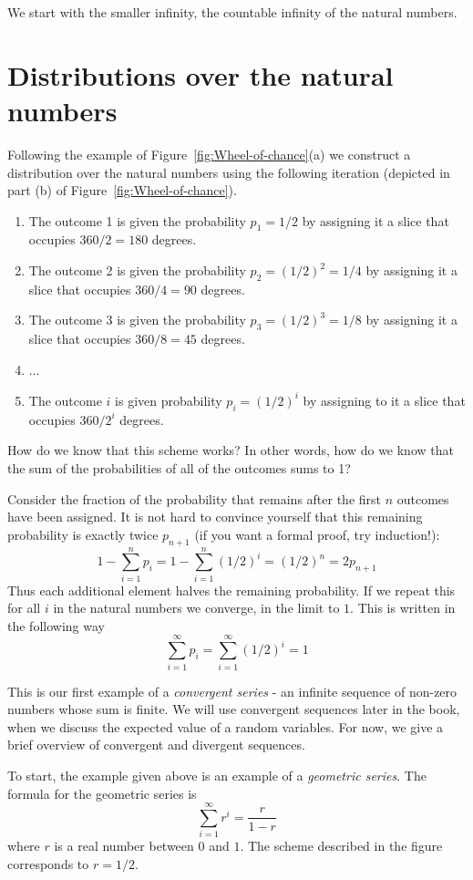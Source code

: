 We start with the smaller infinity, the countable infinity of the natural numbers.

\section{Distributions over the natural numbers}
Following the example of Figure~\ref{fig:Wheel-of-chance}(a) we
construct a distribution over the natural numbers using the following
iteration (depicted in part (b) of Figure~\ref{fig:Wheel-of-chance}).
\begin{enumerate}
\item The outcome 1 is given the probability $p_1=1/2$ by assigning it a
  slice that occupies $360/2 = 180$ degrees.
\item The outcome 2 is given the probability $p_2=(1/2)^2=1/4$ by
  assigning it a slice that occupies $360/4=90$ degrees. 
\item The outcome 3 is given the probability $p_3=(1/2)^3=1/8$ by
  assigning it a slice that occupies $360/8=45$ degrees.
\item ...
\item The outcome $i$ is given probability $p_i=(1/2)^i$ by assigning to
  it a slice that occupies $360/2^i$ degrees. 
\end{enumerate}

How do we know that this scheme works? In other words, how do we know
that the sum of the probabilities of all of the outcomes sums to 1?

Consider the fraction of the probability that remains after the first
$n$ outcomes have been assigned. It is not hard to convince yourself
that this remaining probability is exactly twice $p_{n+1}$ (if you
want a formal proof, try induction!):
\[
1-\sum_{i=1}^n p_i = 1-\sum_{i=1}^n (1/2)^i = (1/2)^n= 2p_{n+1}
\]
Thus each additional element halves the remaining probability. If we
repeat this for all $i$ in the natural numbers we converge, in the
limit to $1$. This is written in the following way
\[
\sum_{i=1}^{\infty} p_i = \sum_{i=1}^{\infty} (1/2)^i = 1
\]

This is our first example of a {\em convergent series} - an infinite
sequence of non-zero numbers whose sum is finite. We will use
convergent sequences later in the book, when we discuss the expected
value of a random variables. For now, we give a brief overview of
convergent and divergent sequences.

To start, the example given above is an example of a {\em geometric
  series}. The formula for the geometric series is 
\[
\sum_{i=1}^{\infty} r^i = \frac{r}{1-r}
\]
where $r$ is a real number between $0$ and $1$. 
The scheme described in the figure corresponds to $r=1/2$.

